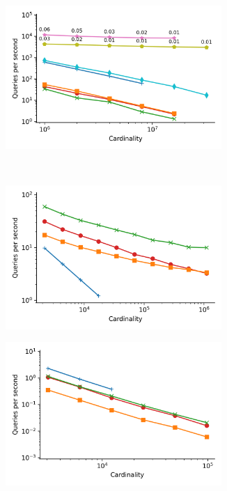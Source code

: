\begin{figure}
\begin{subfigure}[b]{0.47\textwidth}
        \label{fig:results:sift-scaling}
    \end{subfigure}%
    \begin{subfigure}[b]{0.47\textwidth}
        \includegraphics[width=0.9\textwidth]{plots/random_PermutedBall_10_throughput.png}
        \label{fig:results:random-scaling}
    \end{subfigure}%
    \\
    \begin{subfigure}[b]{0.47\textwidth}
        \includegraphics[width=0.9\textwidth]{plots/silva-SSU-Ref_PermutedBall_10_throughput.png}
        \label{fig:results:silva-scaling}
    \end{subfigure}%
    \begin{subfigure}[b]{0.47\textwidth}
        \includegraphics[width=0.9\textwidth]{plots/radio-ml_Ball_10_throughput.png}

\end{subfigure}
\end{figure}
